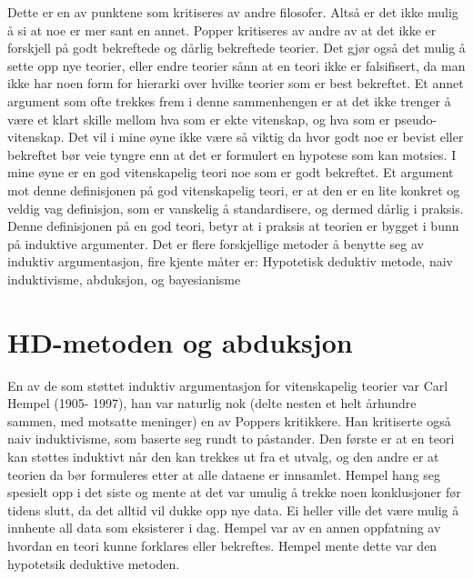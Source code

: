 \documentclass[
]{book}
\begin{document}
Dette er en av punktene som kritiseres av andre filosofer. Altså er det ikke mulig å si at noe er mer sant en annet. Popper kritiseres av andre av at det ikke er forskjell på godt bekreftede og dårlig bekreftede teorier. Det gjør også det mulig å sette opp nye teorier, eller endre teorier sånn at en teori ikke er falsifisert, da man ikke har noen form for hierarki over hvilke teorier som er best bekreftet. Et annet argument som ofte trekkes frem i denne sammenhengen er at det ikke trenger å være et klart skille mellom hva som er ekte vitenskap, og hva som er pseudo-vitenskap. Det vil i mine øyne ikke være så viktig da hvor godt noe er bevist eller bekreftet bør veie tyngre enn at det er formulert en hypotese som kan motsies. I mine øyne er en god vitenskapelig teori noe som er godt bekreftet. Et argument mot denne definisjonen på god vitenskapelig teori, er at den er en lite konkret og veldig vag definisjon, som er vanskelig å standardisere, og dermed dårlig i praksis. Denne definisjonen på en god teori, betyr at i praksis at teorien er bygget i bunn på induktive argumenter. Det er flere forskjellige metoder å benytte seg av induktiv argumentasjon, fire kjente måter er: Hypotetisk deduktiv metode, naiv induktivisme, abduksjon, og bayesianisme\\

\hypertarget{hd-metoden-og-abduksjon}{%
\section{HD-metoden og abduksjon}\label{hd-metoden-og-abduksjon}}

En av de som støttet induktiv argumentasjon for vitenskapelig teorier var Carl Hempel (1905- 1997), han var naturlig nok (delte nesten et helt århundre sammen, med motsatte meninger) en av Poppers kritikkere. Han kritiserte også naiv induktivisme, som baserte seg rundt to påstander. Den første er at en teori kan støttes induktivt når den kan trekkes ut fra et utvalg, og den andre er at teorien da bør formuleres etter at alle dataene er innsamlet. Hempel hang seg spesielt opp i det siste og mente at det var umulig å trekke noen konklusjoner før tidens slutt, da det alltid vil dukke opp nye data. Ei heller ville det være mulig å innhente all data som eksisterer i dag. \citep[s. 11]{hempel1966} Hempel var av en annen oppfatning av hvordan en teori kunne forklares eller bekreftes. Hempel mente dette var den hypotetsik deduktive metoden.\\
\end{document}
